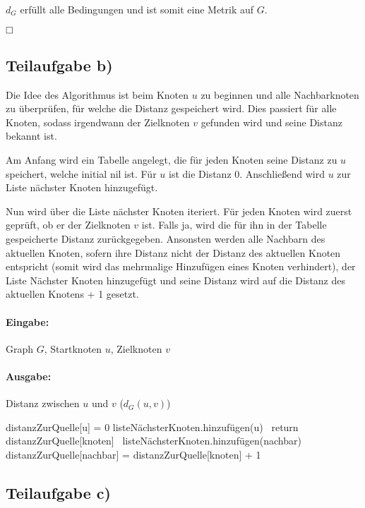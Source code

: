 \documentclass[12pt]{scrartcl}%
\theoremstyle{nonumberplain}
\begin{document}
$d_G$ erfüllt alle Bedingungen und ist somit eine Metrik auf $G$.

$\hfill \square$

\subsection*{Teilaufgabe b)}

Die Idee des Algorithmus ist beim Knoten $u$ zu beginnen und alle Nachbarknoten zu überprüfen, für welche die Distanz gespeichert wird. Dies passiert für alle Knoten, sodass irgendwann der Zielknoten $v$ gefunden wird und seine Distanz bekannt ist.

Am Anfang wird ein Tabelle angelegt, die für jeden Knoten seine Distanz zu $u$ speichert, welche initial nil ist. Für $u$ ist die Distanz 0. Anschließend wird $u$ zur Liste nächster Knoten hinzugefügt. 

Nun wird über die Liste nächster Knoten iteriert. Für jeden Knoten wird zuerst geprüft, ob er der Zielknoten $v$ ist. Falls ja, wird die für ihn in der Tabelle gespeicherte Distanz zurückgegeben. Ansonsten werden alle Nachbarn des aktuellen Knoten, sofern ihre Distanz nicht der Distanz des aktuellen Knoten entspricht (somit wird das mehrmalige Hinzufügen eines Knoten verhindert), der Liste Nächster Knoten hinzugefügt und seine Distanz wird auf die Distanz des aktuellen Knotens + 1 gesetzt.

\paragraph{Eingabe:} Graph $G$, Startknoten $u$, Zielknoten $v$

\paragraph{Ausgabe:} Distanz zwischen $u$ und $v$ ($d_G(u,v)$)

\begin{algorithm}
	distanzZurQuelle[u] = 0\;
	listeNächsterKnoten.hinzufügen(u)\;
	 {
		 {\
			return distanzZurQuelle[knoten]\;
		}	
		 {
			\If{distanzZurQuelle[nachbar] == nil]} {\
				listeNächsterKnoten.hinzufügen(nachbar)\;
				distanzZurQuelle[nachbar] = distanzZurQuelle[knoten] + 1\;
			}
		}
	}
\end{algorithm}

\subsection*{Teilaufgabe c)}
\end{document}
